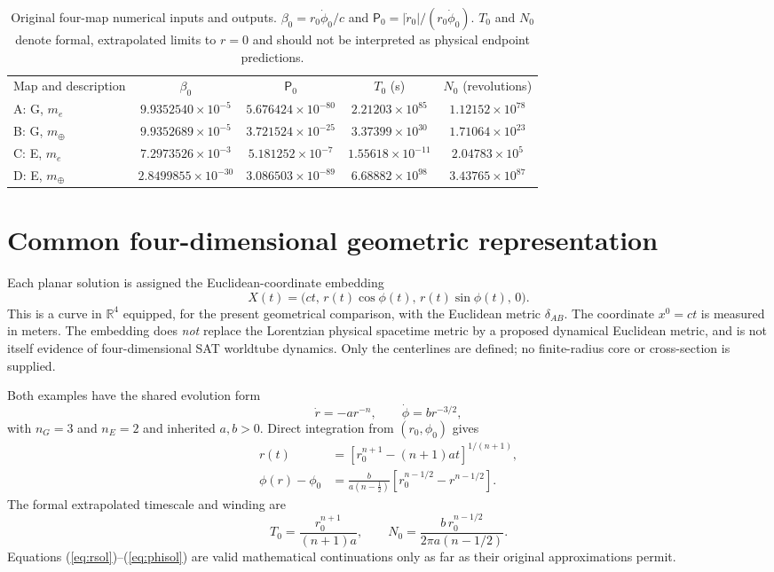 \documentclass[aps,prd,reprint,onecolumn,superscriptaddress,nofootinbib]{revtex4-2}
\newcommand{\PiH}{\mathsf P}
\begin{document}
\begin{table}[h]
\caption{Original four-map numerical inputs and outputs. $\beta_0=r_0\dot\phi_0/c$ and $\PiH_0=|\dot r_0|/(r_0\dot\phi_0)$. $T_0$ and $N_0$ denote formal, extrapolated limits to $r=0$ and should not be interpreted as physical endpoint predictions.}
\begin{ruledtabular}
\begin{tabular}{lcccc}
Map and description & $\beta_0$ & $\PiH_0$ & $T_0$ (s) & $N_0$ (revolutions)\\
A: G, $m_e$ & $9.9352540\times10^{-5}$ & $5.676424\times10^{-80}$ & $2.21203\times10^{85}$ & $1.12152\times10^{78}$\\
B: G, $m_\oplus$ & $9.9352689\times10^{-5}$ & $3.721524\times10^{-25}$ & $3.37399\times10^{30}$ & $1.71064\times10^{23}$\\
C: E, $m_e$ & $7.2973526\times10^{-3}$ & $5.181252\times10^{-7}$ & $1.55618\times10^{-11}$ & $2.04783\times10^{5}$\\
D: E, $m_\oplus$ & $2.8499855\times10^{-30}$ & $3.086503\times10^{-89}$ & $6.68882\times10^{98}$ & $3.43765\times10^{87}$
\end{tabular}
\end{ruledtabular}
\end{table}

\section{Common four-dimensional geometric representation}
Each planar solution is assigned the Euclidean-coordinate embedding
\begin{equation}
 X(t)=\big(ct,\,r(t)\cos\phi(t),\,r(t)\sin\phi(t),\,0\big).\label{eq:X}
\end{equation}
This is a curve in $\mathbb R^4$ equipped, for the present geometrical comparison, with the Euclidean metric $\delta_{AB}$. The coordinate $x^0=ct$ is measured in meters. The embedding does \emph{not} replace the Lorentzian physical spacetime metric by a proposed dynamical Euclidean metric, and is not itself evidence of four-dimensional SAT worldtube dynamics. Only the centerlines are defined; no finite-radius core or cross-section is supplied.

Both examples have the shared evolution form
\begin{equation}
 \dot r=-ar^{-n},\qquad \dot\phi=br^{-3/2},\label{eq:common}
\end{equation}
with $n_G=3$ and $n_E=2$ and inherited $a,b>0$. Direct integration from $(r_0,\phi_0)$ gives
\begin{align}
 r(t)&=\left[r_0^{n+1}-(n+1)at\right]^{1/(n+1)},\label{eq:rsol}\\
 \phi(r)-\phi_0&=\frac{b}{a(n-\tfrac12)}\left[r_0^{n-1/2}-r^{n-1/2}\right].\label{eq:phisol}
\end{align}
The formal extrapolated timescale and winding are
\begin{equation}
 T_0=\frac{r_0^{n+1}}{(n+1)a},\qquad N_0=\frac{b\,r_0^{n-1/2}}{2\pi a(n-1/2)}.
\end{equation}
Equations (\ref{eq:rsol})--(\ref{eq:phisol}) are valid mathematical continuations only as far as their original approximations permit.
\end{document}
